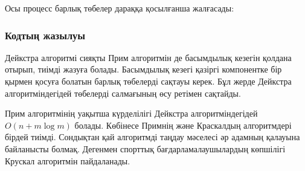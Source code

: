 \begin{samepage}
Осы процесс барлық төбелер дараққа қосылғанша жалғасады: 
\begin{center}
\end{center}
\end{samepage}

\subsubsection{Кодтың жазылуы}

Дейкстра алгоритмі сияқты Прим алгоритмін де басымдылық кезегін қолдана
отырып, тиімді жазуға болады. Басымдылық кезегі қазіргі компонентке
бір қырмен қосуға болатын барлық төбелерді сақтауы керек. Бұл жерде 
Дейкстра алгоритміндегідей төбелерді салмағының өсу ретімен сақтайды.


Прим алгоритмінің уақытша күрделілігі Дейкстра алгоритміндегідей
$O(n + m \log m)$ болады. Көбінесе Примнің және Краскалдың 
алгоритмдері бірдей тиімді. Сондықтан қай алгоритмді таңдау мәселесі әр адамның
қалауына байланысты болмақ.
Дегенмен спорттық бағдарламалаушылардың көпшілігі Крускал алгоритмін пайдаланады.
